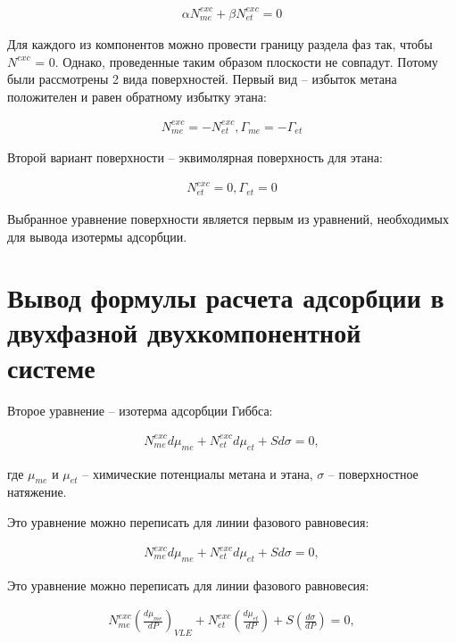 \begin{align}
	\alpha N_{me}^{exc} + \beta N_{et}^{exc} = 0
\end{align}

Для каждого из компонентов можно провести границу раздела фаз так, чтобы $N^{exc}$ = 0. Однако, проведенные таким образом плоскости не совпадут. Потому были рассмотрены 2 вида поверхностей. Первый вид \--- избыток метана положителен и равен обратному избытку этана:

\begin{align}
	\label{equalads}
	N_{me}^{exc} = -N_{et}^{exc}, \Gamma_{me} = - \Gamma_{et}
\end{align}

Второй вариант поверхности \--- эквимолярная поверхность для этана:

\begin{align}
	\label{eq:noetads}
	N_{et}^{exc} = 0, \Gamma_{et} = 0
\end{align}

Выбранное уравнение поверхности является первым из уравнений, необходимых для вывода изотермы адсорбции.

\section{Вывод формулы расчета адсорбции в двухфазной двухкомпонентной системе}

Второе уравнение \--- изотерма адсорбции Гиббса:

\begin{align}
	N_{me}^{exc} d \mu_{me} + N_{et}^{exc} d \mu_{et} + S d \sigma = 0,
\end{align}

где $\mu_{me}$ и $\mu_{et}$ \--- химические потенциалы метана и этана, $\sigma$ \--- поверхностное натяжение.

Это уравнение можно переписать для линии фазового равновесия: 

\begin{align}
	N_{me}^{exc} d \mu_{me} + N_{et}^{exc} d \mu_{et} + S d \sigma = 0,
\end{align}

Это уравнение можно переписать для линии фазового равновесия: 

\begin{align}
	N_{me}^{exc} ( \frac{d \mu_{me}}{dP})_{VLE} + N_{et}^{exc} (\frac{d \mu_{et}}{dP}) + S (\frac{d \sigma}{dP}) = 0, \label{eq:isotherm}
\end{align}

